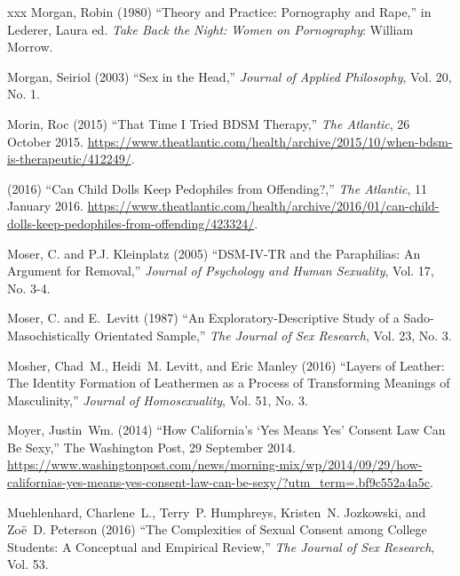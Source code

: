 \documentclass[]{jlreq} \usepackage{mystyle}
\begin{document}
\begin{thebibliography}{xxx}
Morgan, Robin (1980) ``Theory and Practice: Pornography and Rape,'' in Lederer,
  Laura ed.   \textit{ Take Back the Night: Women on Pornography}: William
  Morrow.

Morgan, Seiriol (2003) ``Sex in the Head,'' \textit{ Journal of Applied
  Philosophy}, Vol. 20, No. 1.

Morin, Roc (2015) ``That Time I Tried BDSM Therapy,'' \emph{The Atlantic}, 26
  October 2015.
  \url{https://www.theatlantic.com/health/archive/2015/10/when-bdsm-is-therapeutic/412249/}.

 \bysame{}  (2016) ``Can Child Dolls Keep Pedophiles from Offending?,''
  \emph{The Atlantic}, 11 January 2016.
  \url{https://www.theatlantic.com/health/archive/2016/01/can-child-dolls-keep-pedophiles-from-offending/423324/}.

Moser, C. and P.J. Kleinplatz (2005) ``DSM-IV-TR and the Paraphilias: An
  Argument for Removal,'' \textit{ Journal of Psychology and Human Sexuality},
  Vol. 17, No. 3-4.

Moser, C. and E.~Levitt (1987) ``An Exploratory-Descriptive Study of a
  Sado-Masochistically Orientated Sample,'' \textit{ The Journal of Sex
  Research}, Vol. 23, No. 3.

Mosher, Chad~M., Heidi~M. Levitt, and Eric Manley (2016) ``Layers of Leather:
  The Identity Formation of Leathermen as a Process of Transforming Meanings of
  Masculinity,'' \textit{ Journal of Homosexuality}, Vol. 51, No. 3.

Moyer, Justin~Wm. (2014) ``How California's `Yes Means Yes' Consent Law Can Be
  Sexy,'' The Washington Post, 29 September 2014.
  \url{https://www.washingtonpost.com/news/morning-mix/wp/2014/09/29/how-californias-yes-means-yes-consent-law-can-be-sexy/?utm_term=.bf9c552a4a5c}.

Muehlenhard, Charlene~L., Terry~P. Humphreys, Kristen~N. Jozkowski, and Zoë~D.
  Peterson (2016) ``The Complexities of Sexual Consent among College Students:
  A Conceptual and Empirical Review,'' \textit{ The Journal of Sex Research},
  Vol. 53.


\end{thebibliography}
\end{document}
